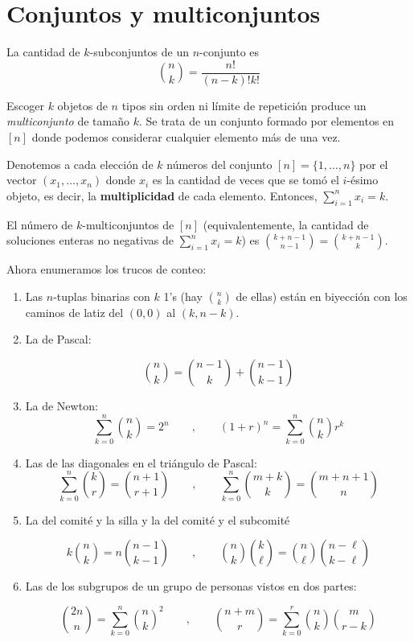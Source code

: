 \section{Conjuntos y
multiconjuntos}\label{chap-set-multiset}
\begin{proposition}
\label{proposition-combi-001}
La cantidad de $k$-subconjuntos de un
$n$-conjunto es
$$
{n\choose k}=\frac{n!}{(n-k)!k!}
$$

\end{proposition}
\begin{definition}
\label{definition-combi-001}
Escoger $k$ objetos de $n$ tipos sin orden ni
límite de repetición produce un
\emph{multiconjunto} de tamaño $k$. Se trata
de un conjunto formado por elementos en $[n]$
donde podemos considerar cualquier elemento
más de una vez.
\end{definition}
\begin{remark}
\label{remark-combi-001}
Denotemos a cada elección de $k$ números del
conjunto $[n] = \{1, \ldots,n\}$ por el
vector $(x_1, \ldots,x_n)$ donde $x_i$ es la
cantidad de veces que se tomó el $i$-ésimo
objeto, es decir, la \textbf{multiplicidad}
de cada elemento. Entonces, $ \sum_{i =
1}^nx_i = k$.
\end{remark}
\begin{theorem}
\label{thm-thm1}
El número de $k$-multiconjuntos de $[n]$
(equivalentemente, la cantidad de soluciones
enteras no negativas de $ \sum_{i = 1}^nx_i =
k$) es ${k + n-1 \choose n-1} = {k + n-1
\choose k}$.
\end{theorem}
Ahora enumeramos los trucos de conteo:
\begin{enumerate}
\item Las $n$-tuplas binarias con $k$ 1's
(hay ${n \choose k}$ de ellas) están en
biyección con los caminos de latiz del
$(0,0)$ al $(k,n-k)$.

\item La de Pascal:

$$
{n\choose k}={n-1\choose k}+{n-1\choose k-1}
$$

\item La de Newton:
$$
 \sum_{k = 0}^n{n \choose k} = 2^n \qquad,
\qquad (1 + r)^n =  \sum_{k = 0}^n{n \choose
k}r^k
$$

\item Las de las diagonales en el triángulo
de Pascal:
$$
 \sum_{k = 0}^n{k \choose r} = {n + 1 \choose
r + 1} \qquad, \qquad  \sum_{k = 0}^n{m + k
\choose k} = {m + n + 1 \choose n}
$$

\item La del comité y la silla y la del
comité y el subcomité

$$
k{n \choose k} = n{n-1 \choose k-1} \qquad,
\qquad {n \choose k}{k \choose \ell} = {n
\choose\ell}{n-\ell \choose k-\ell}
$$

\item Las de los subgrupos de un grupo de
personas vistos en dos partes:

$$
{2n \choose n} =  \sum_{k = 0}^n{n \choose
k}^2 \qquad, \qquad{n + m \choose r} =
\sum_{k = 0}^r{n \choose k}{m \choose r-k}
$$

\end{enumerate}

